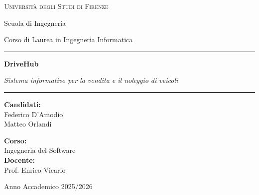\documentclass[12pt,a4paper]{report}
\begin{document}
\hypersetup{pageanchor=false}
\begin{titlepage}
  \centering
  {\Large\textsc{Università degli Studi di Firenze}\par}
  {\large Scuola di Ingegneria\par}
  {\large Corso di Laurea in Ingegneria Informatica\par}
  \vspace{2cm}
  \rule{\linewidth}{.5pt}\par\vspace{.8cm}
  {\Huge\bfseries\color{blue!55!black} DriveHub\par}\vspace{.35cm}
  {\Large\itshape Sistema informativo per la vendita e il noleggio di veicoli\par}
  \vspace{.8cm}\rule{\linewidth}{.5pt}\par
  \vspace{1.7cm}
  \begin{minipage}[t]{.48\linewidth}\raggedright
    \textbf{Candidati:}\\[.3cm]
    Federico D'Amodio\\
    Matteo Orlandi
  \end{minipage}\hfill
  \begin{minipage}[t]{.48\linewidth}\raggedleft
    \textbf{Corso:}\\
    Ingegneria del Software\\[.35cm]
    \textbf{Docente:}\\
    Prof. Enrico Vicario
  \end{minipage}
  \vfill
  {\large Anno Accademico 2025/2026\par}
\end{titlepage}
\hypersetup{pageanchor=true}
\tableofcontents\clearpage{}




\end{document}

